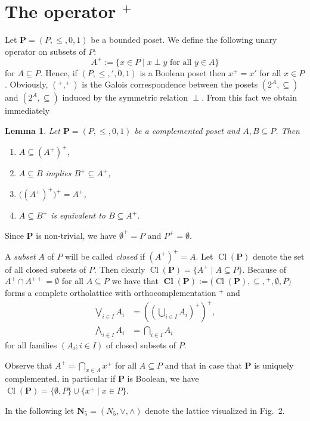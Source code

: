 \documentclass[12pt]{article}
\DeclareMathOperator{\Cl}{Cl}
\DeclareMathOperator{\BCl}{\mathbf{Cl}}
\newtheorem{lemma}[theorem]{Lemma}
\begin{document}
\section{The operator $^+$}

Let $\mathbf P=(P,\le,0,1)$ be a bounded poset. We define the following unary operator on subsets of $P$:
\[
A^+:=\{x\in P\mid x\perp y\text{ for all }y\in A\}
\]
for $A\subseteq P$. Hence, if $(P,\le,{}',0,1)$ is a Boolean poset then $x^+=x'$ for all $x\in P$. Obviously, $(^+,^+)$ is the Galois correspondence between the posets $(2^A,\subseteq)$ and $(2^A,\subseteq)$ induced by the symmetric relation $\perp$. From this fact we obtain immediately

\begin{lemma}
Let $\mathbf P=(P,\le,0,1)$ be a complemented poset and $A,B\subseteq P$. Then
\begin{enumerate}[{\rm(i)}]
\item $A\subseteq (A^+)^+$,
\item $A\subseteq B$ implies $B^+\subseteq A^+$,
\item $\big((A^+)^+\big)^+=A^+$,
\item $A\subseteq B^+$ is equivalent to $B\subseteq A^+$.
\end{enumerate}
\end{lemma}

Since $\mathbf P$ is non-trivial, we have $\emptyset^+=P$ and $P^+=\emptyset$.

A {\em subset} $A$ of $P$ will be called {\em closed} if $(A^+)^+=A$. Let $\Cl(\mathbf P)$ denote the set of all closed subsets of $P$. Then clearly $\Cl(\mathbf P)=\{A^+\mid A\subseteq P\}$. Because of $A^+\cap A^{++}=\emptyset$ for all $A\subseteq P$ we have that $\BCl(\mathbf P):=\big(\Cl(\mathbf P),\subseteq,{}^+,\emptyset,P\big)$ forms a complete ortholattice with orthocomplementation $^+$ and
\begin{align*}
  \bigvee_{i\in I}A_i & =\left(\left(\bigcup_{i\in I}A_i\right)^+\right)^+, \\
\bigwedge_{i\in I}A_i & =\bigcap_{i\in I}A_i
\end{align*}
for all families $(A_i;i\in I)$ of closed subsets of $P$.

Observe that $A^+=\bigcap\limits_{x\in A}x^+$ for all $A\subseteq P$ and that in case that $\mathbf P$ is uniquely complemented, in particular if $\mathbf P$ is Boolean, we have $\Cl(\mathbf P)=\{\emptyset,P\}\cup\{x^+\mid x\in P\}$.

In the following let $\mathbf N_5=(N_5,\vee,\wedge)$ denote the lattice visualized in Fig.~2.
	
\end{document}
